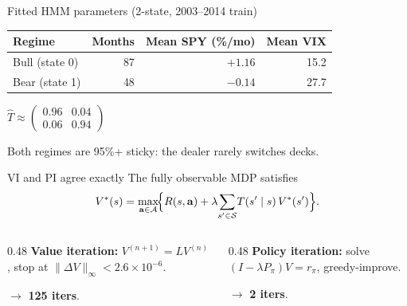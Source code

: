 \documentclass[11pt,aspectratio=169]{beamer}
\newcommand{\state}{\mathcal{S}}
\renewcommand{\action}{\mathcal{A}}
\begin{document}
\begin{frame}{Fitted HMM parameters (2-state, 2003--2014 train)}
\bigskip
\centering
\large
\renewcommand{\arraystretch}{1.3}
\begin{tabular}{lrrr}
\toprule
\textbf{Regime} & \textbf{Months} & \textbf{Mean SPY (\%/mo)} & \textbf{Mean VIX} \\
\midrule
Bull (state 0) & 87 & $+1.16$ & 15.2 \\
Bear (state 1) & 48 & $-0.14$ & 27.7 \\
\bottomrule
\end{tabular}

\bigskip\bigskip
$\hat T \approx \begin{pmatrix}0.96 & 0.04 \\ 0.06 & 0.94\end{pmatrix}$

\bigskip
\small Both regimes are 95\%+ sticky: the dealer rarely switches decks.
\end{frame}

\begin{frame}{VI and PI agree exactly}
\small
The fully observable MDP satisfies
\[
V^\ast(s) = \max_{\mathbf{a}\in\action}\!\Bigl\{R(s,\mathbf{a}) + \lambda\!\sum_{s'\in\state}\!T(s'\mid s)\,V^\ast(s')\Bigr\}.
\]
\medskip
\begin{columns}[T]
\begin{column}{0.48\linewidth}
\textbf{Value iteration:} $V^{(n+1)}=LV^{(n)}$, stop at $\|\Delta V\|_\infty<2.6\times 10^{-6}$.

\smallskip
$\to$ \textbf{125 iters}.
\end{column}\begin{column}{0.48\linewidth}
\textbf{Policy iteration:} solve $(I-\lambda P_\pi)V=r_\pi$, greedy-improve.

\smallskip
$\to$ \textbf{2 iters}.
\end{column}
\end{columns}

\bigskip
{}
\end{frame}
\end{document}
